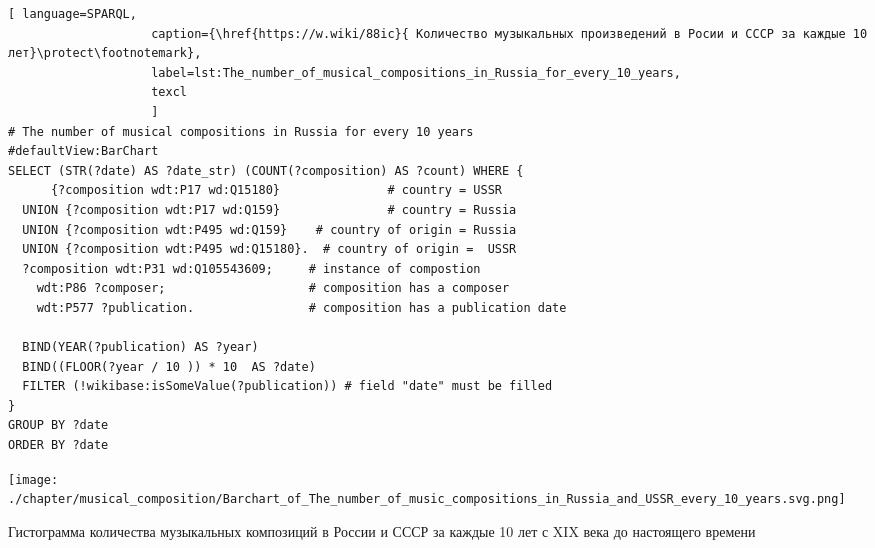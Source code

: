 \begin{lstlisting}[ language=SPARQL,
                    caption={\href{https://w.wiki/88ic}{ Количество музыкальных произведений в Росии и СССР за каждые 10 лет}\protect\footnotemark},
                    label=lst:The_number_of_musical_compositions_in_Russia_for_every_10_years,
                    texcl 
                    ]
# The number of musical compositions in Russia for every 10 years
#defaultView:BarChart
SELECT (STR(?date) AS ?date_str) (COUNT(?composition) AS ?count) WHERE {
      {?composition wdt:P17 wd:Q15180}               # country = USSR
  UNION {?composition wdt:P17 wd:Q159}               # country = Russia
  UNION {?composition wdt:P495 wd:Q159}    # country of origin = Russia
  UNION {?composition wdt:P495 wd:Q15180}.  # country of origin =  USSR
  ?composition wdt:P31 wd:Q105543609;     # instance of compostion
    wdt:P86 ?composer;                    # composition has a composer
    wdt:P577 ?publication.                # composition has a publication date

  BIND(YEAR(?publication) AS ?year)
  BIND((FLOOR(?year / 10 )) * 10  AS ?date)
  FILTER (!wikibase:isSomeValue(?publication)) # field "date" must be filled
}
GROUP BY ?date
ORDER BY ?date
\end{lstlisting}%

\begin{marginfigure}[0\baselineskip]
	\texttt{[image: ./chapter/musical\_composition/Barchart\_of\_The\_number\_of\_music\_compositions\_in\_Russia\_and\_USSR\_every\_10\_years.svg.png]}
	\caption[Гистограмма количества музыкальных композиций в России и СССР за каждые 10 лет с XIX века до настоящего времени]{Гистограмма количества музыкальных композиций в России и СССР за каждые 10 лет с XIX века до настоящего времени}%
\end{marginfigure}

